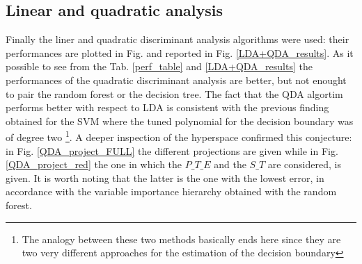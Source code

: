 \documentclass[
12pt, %
a4paper, %
oneside, %
headinclude,footinclude, %
BCOR5mm, %
]{scrartcl}
\begin{document}
\subsection{Linear and quadratic analysis}
Finally the liner and quadratic discriminant analysis algorithms were used: their performances are plotted in Fig. and reported in Fig. \ref{LDA+QDA_results}. As it possible to see from the Tab. \ref{perf_table} and \ref{LDA+QDA_results} the performances of the quadratic discriminant analysis are better, but not enought to pair the random forest or the decision tree. The fact that the QDA algortim performs better with respect to LDA is consistent with the previous finding obtained for the SVM where the tuned polynomial for the decision boundary was of degree two \footnote{The analogy between these two methods basically ends here since they are two very different approaches for the estimation of the decision boundary}. A deeper inspection of the hyperspace confirmed this conjecture: in Fig. \ref{QDA_project_FULL} the different projections are given while in Fig. \ref{QDA_project_red} the one in which the $P\_T\_E$ and the $S\_T$ are considered, is given. It is worth noting that the latter is the one with the lowest error, in accordance with the variable importance hierarchy obtained with the random forest.  
\end{document}
